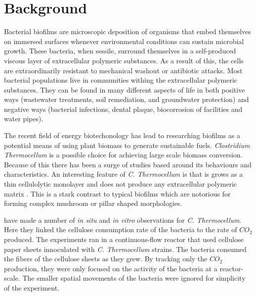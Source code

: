 \section{Background}

Bacterial biofilms are microscopic deposition of organisms that embed themselves on immersed surfaces whenever environmental conditions can sustain microbial growth.
These bacteria, when sessile, surround themselves in a self-produced viscous layer of extracellular polymeric substances.
As a result of this, the cells are extraordinarily resistant to mechanical washout or antibiotic attacks.
Most bacterial populations live in communities withing the extracellular polymeric substances.
They can be found in many different aspects of life in both positive ways (wastewater treatments, soil remediation, and groundwater protection) and negative ways (bacterial infections, dental plaque, biocorrosion of facilities and water pipes).

The recent field of energy biotechonology has lead to researching biofilms as a potential means of using plant biomass to generate sustainable fuels. %
\textit{Clostridium Thermocellum} is a possible choice for achieving large scale biomass conversion. %
Because of this there has been a surge of studies based around its behaviours and characteristics.
An interesting feature of \textit{C. Thermocellum} is that is grows as a thin cellulolytic monolayer and does not produce any extracellular polymeric matrix \citep{dumitrache2013formFunction}.
This is a stark contrast to typical biofilms which are notorious for forming complex mushroom or pillar shaped morphologies.

\cite{dumitrache2014understanding} have made a number of \textit{in situ} and \textit{in vitro} observations for \textit{C. Thermocellum}.
Here they linked the cellulose consumption rate of the bacteria to the rate of $CO_2$ produced.
The experiments ran in a continuous-flow reactor that used cellulose paper sheets innoculated with \textit{C. Thermocellum} strains.
The bacteria consumed the fibers of the cellulose sheets as they grew.
By tracking only the $CO_2$ production, they were only focused on the activity of the bacteria at a reactor-scale.
The smaller spatial movements of the bacteria were ignored for simplicity of the experiment.

